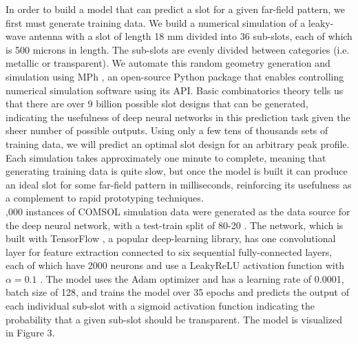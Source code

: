 \documentclass[11pt]{article}
\begin{document}
\noindent In order to build a model that can predict a slot for a given far-field pattern, we first must generate training data. We build a numerical simulation of a leaky-wave antenna with a slot of length 18 mm divided into 36 sub-slots, each of which is 500 microns in length. The sub-slots are evenly divided between categories (i.e. metallic or transparent). We automate this random geometry generation and simulation using MPh \cite{john_hennig_2022_6312347}, an open-source Python package that enables controlling numerical simulation software using its API. Basic combinatorics theory tells us that there are over 9 billion possible slot designs that can be generated, indicating the usefulness of deep neural networks in this prediction task given the sheer number of possible outputs. Using only a few tens of thousands sets of training data, we will  predict an optimal slot design for an arbitrary peak profile. Each simulation takes approximately one minute to complete, meaning that generating training data is quite slow, but once the model is built it can produce an ideal slot for some far-field pattern in milliseconds, reinforcing its usefulness as a complement to rapid prototyping techniques. \\

,000 instances of COMSOL simulation data were generated as the data source for the deep neural network, with a test-train split of 80-20 \cite{molecules26041111}. The network, which is built with TensorFlow \cite{tensorflow2015-whitepaper}, a popular deep-learning library, has one convolutional layer for feature extraction \cite{albawi2017understanding} connected to six sequential fully-connected layers, each of which have 2000 neurons and use a LeakyReLU activation function with $\alpha = 0.1$ \cite{nair2010rectified}. The model uses the Adam optimizer \cite{kingma2014adam} and has a learning rate of 0.0001, batch size of 128, and trains the model over 35 epochs \cite{smith2018disciplined} and predicts the output of each individual sub-slot with a sigmoid activation function indicating the probability that a given sub-slot should be transparent. The model is visualized in Figure 3. \\

\end{document}
